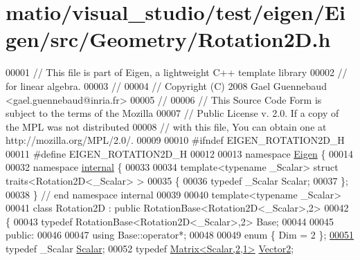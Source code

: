 \hypertarget{matio_2visual__studio_2test_2eigen_2_eigen_2src_2_geometry_2_rotation2_d_8h_source}{}\section{matio/visual\+\_\+studio/test/eigen/\+Eigen/src/\+Geometry/\+Rotation2D.h}
\label{matio_2visual__studio_2test_2eigen_2_eigen_2src_2_geometry_2_rotation2_d_8h_source}

\begin{DoxyCode}
00001 \textcolor{comment}{// This file is part of Eigen, a lightweight C++ template library}
00002 \textcolor{comment}{// for linear algebra.}
00003 \textcolor{comment}{//}
00004 \textcolor{comment}{// Copyright (C) 2008 Gael Guennebaud <gael.guennebaud@inria.fr>}
00005 \textcolor{comment}{//}
00006 \textcolor{comment}{// This Source Code Form is subject to the terms of the Mozilla}
00007 \textcolor{comment}{// Public License v. 2.0. If a copy of the MPL was not distributed}
00008 \textcolor{comment}{// with this file, You can obtain one at http://mozilla.org/MPL/2.0/.}
00009 
00010 \textcolor{preprocessor}{#ifndef EIGEN\_ROTATION2D\_H}
00011 \textcolor{preprocessor}{#define EIGEN\_ROTATION2D\_H}
00012 
00013 \textcolor{keyword}{namespace }\hyperlink{namespace_eigen}{Eigen} \{ 
00014 
00032 \textcolor{keyword}{namespace }\hyperlink{namespaceinternal}{internal} \{
00033 
00034 \textcolor{keyword}{template}<\textcolor{keyword}{typename} \_Scalar> \textcolor{keyword}{struct }traits<Rotation2D<\_Scalar> >
00035 \{
00036   \textcolor{keyword}{typedef} \_Scalar Scalar;
00037 \};
00038 \} \textcolor{comment}{// end namespace internal}
00039 
00040 \textcolor{keyword}{template}<\textcolor{keyword}{typename} \_Scalar>
00041 \textcolor{keyword}{class }Rotation2D : \textcolor{keyword}{public} RotationBase<Rotation2D<\_Scalar>,2>
00042 \{
00043   \textcolor{keyword}{typedef} RotationBase<Rotation2D<\_Scalar>,2> Base;
00044 
00045 \textcolor{keyword}{public}:
00046 
00047   \textcolor{keyword}{using} Base::operator*;
00048 
00049   \textcolor{keyword}{enum} \{ Dim = 2 \};
\hyperlink{group___geometry___module_ac20c665ece0f197a712a2a39ae72e4e4}{00051}   \textcolor{keyword}{typedef} \_Scalar \hyperlink{group___geometry___module_ac20c665ece0f197a712a2a39ae72e4e4}{Scalar};
00052   \textcolor{keyword}{typedef} \hyperlink{group___core___module_class_eigen_1_1_matrix}{Matrix<Scalar,2,1>} \hyperlink{group___core___module_class_eigen_1_1_matrix}{Vector2};

\end{DoxyCode}
